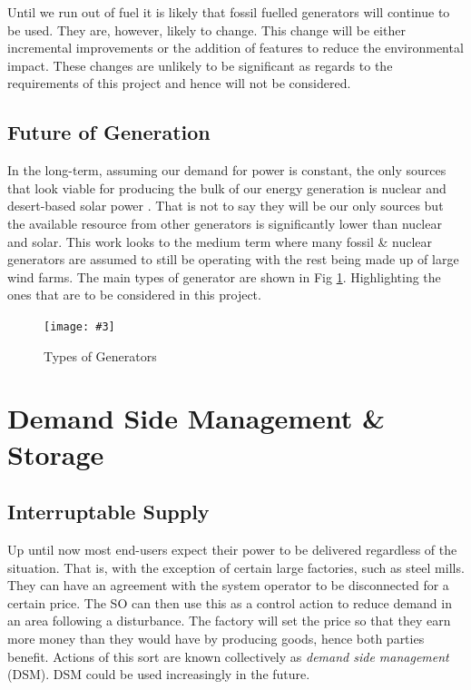 \documentclass[a4paper,oneside,12pt]{report}
\newcommand{\image}[3] {
  \begin{figure}
    \begin{center}
      \texttt{[image: \#3]}
      \caption{#2}
      \label{#1}
    \end{center}
  \end{figure}
}
\begin{document}
Until we run out of fuel it is likely that fossil fuelled generators will continue to be used. They are, however, likely to change. This change will be either incremental improvements or the addition of features to reduce the environmental impact. These changes are unlikely to be significant as regards to the requirements of this project and hence will not be considered.

\subsection{Future of Generation}

In the long-term, assuming our demand for power is constant, the only sources that look viable for producing the bulk of our energy generation is nuclear and desert-based solar power \cite{MacKay2009}. That is not to say they will be our only sources but the available resource from other generators is significantly lower than nuclear and solar. This work looks to the medium term where many fossil \& nuclear generators are assumed to still be operating with the rest being made up of large wind farms. The main types of generator are shown in Fig \ref{generationtypes}. Highlighting the ones that are to be considered in this project.


\image{generationtypes}{Types of Generators}{generationtypes.png}

\section{Demand Side Management \& Storage}

\subsection{Interruptable Supply}

Up until now most end-users expect their power to be delivered regardless of the situation. That is, with the exception of certain large factories, such as steel mills. They can have an agreement with the system operator to be disconnected for a certain price. The SO can then use this as a control action to reduce demand in an area following a disturbance. The factory will set the price so that they earn more money than they would have by producing goods, hence both parties benefit. Actions of this sort are known collectively as \emph{demand side management} (DSM). DSM could be used increasingly in the future.
\end{document}
